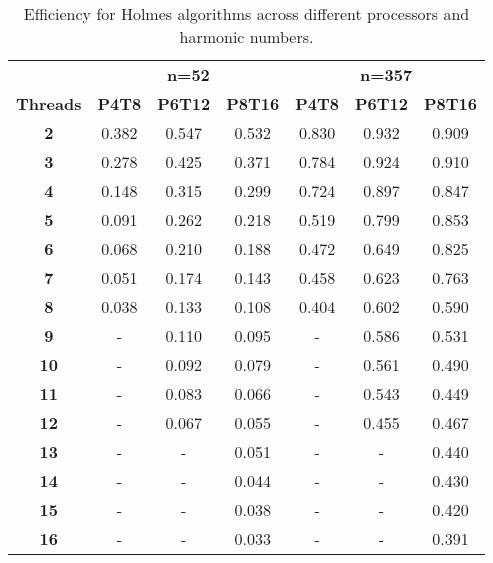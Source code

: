 
\begin{table*}[ht]
\centering
\caption{Efficiency for Holmes algorithms across different processors and harmonic numbers.}
\label{tab:efficiency_metrics}
\begin{tabular}{c|ccc|ccc}
\hline
 & \multicolumn{3}{c}{\textbf{n=52}}  & \multicolumn{3}{c}{\textbf{n=357}}  \\
\cline{2-7}
{\textbf{Threads}}
& \textbf{P4T8} & \textbf{P6T12} & \textbf{P8T16} & \textbf{P4T8} & \textbf{P6T12} & \textbf{P8T16} \\
\hline
\textbf{2} & 0.382 & 0.547 & 0.532 & 0.830 & 0.932 & 0.909 \\ \hline
\textbf{3} & 0.278 & 0.425 & 0.371 & 0.784 & 0.924 & 0.910 \\ \hline
\textbf{4} & 0.148 & 0.315 & 0.299 & 0.724 & 0.897 & 0.847 \\ \hline
\textbf{5} & 0.091 & 0.262 & 0.218 & 0.519 & 0.799 & 0.853 \\ \hline
\textbf{6} & 0.068 & 0.210 & 0.188 & 0.472 & 0.649 & 0.825 \\ \hline
\textbf{7} & 0.051 & 0.174 & 0.143 & 0.458 & 0.623 & 0.763 \\ \hline
\textbf{8} & 0.038 & 0.133 & 0.108 & 0.404 & 0.602 & 0.590 \\ \hline
\textbf{9} & - & 0.110 & 0.095 & - & 0.586 & 0.531 \\ \hline
\textbf{10} & - & 0.092 & 0.079 & - & 0.561 & 0.490 \\ \hline
\textbf{11} & - & 0.083 & 0.066 & - & 0.543 & 0.449 \\ \hline
\textbf{12} & - & 0.067 & 0.055 & - & 0.455 & 0.467 \\ \hline
\textbf{13} & - & - & 0.051 & - & - & 0.440 \\ \hline
\textbf{14} & - & - & 0.044 & - & - & 0.430 \\ \hline
\textbf{15} & - & - & 0.038 & - & - & 0.420 \\ \hline
\textbf{16} & - & - & 0.033 & - & - & 0.391 \\ \hline

\end{tabular}
\end{table*}
